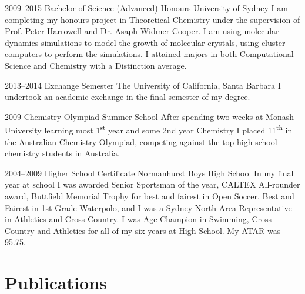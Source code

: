 \documentclass[print]{friggeri-cv} %
\begin{document}
\begin{entrylist}


\entry
{2009--2015}
{Bachelor of Science (Advanced) Honours}
{University of Sydney}
{I am completing my honours project in Theoretical Chemistry under the supervision of Prof. Peter Harrowell and Dr. Asaph Widmer-Cooper. I am using molecular dynamics simulations to model the growth of molecular crystals, using cluster computers to perform the simulations. I attained majors in both Computational Science and Chemistry with a Distinction average.
}


\entry
{2013--2014}
{Exchange Semester}
{The University of California, Santa Barbara}
{I undertook an academic exchange in the final semester of my degree.}


\entry
{2009}
{Chemistry Olympiad Summer School}
{}
{After spending two weeks at Monash University learning most 1\textsuperscript{st} year and some 2nd year Chemistry I placed 11\textsuperscript{th} in the Australian Chemistry Olympiad, competing against the top high school chemistry students in Australia.}

\entry
{2004--2009}
{Higher School Certificate}
{Normanhurst Boys High School}
{In my final year at school I was awarded Senior Sportsman of the year, CALTEX All-rounder award, Buttfield Memorial Trophy for best and fairest in Open Soccer, Best and Fairest in 1st Grade Waterpolo, and I was a Sydney North Area Representative in Athletics and Cross Country. I was Age Champion in Swimming, Cross Country and Athletics for all of my six years at High School. My ATAR was 95.75.
}


\end{entrylist}



\section{Publications}
\end{document}
